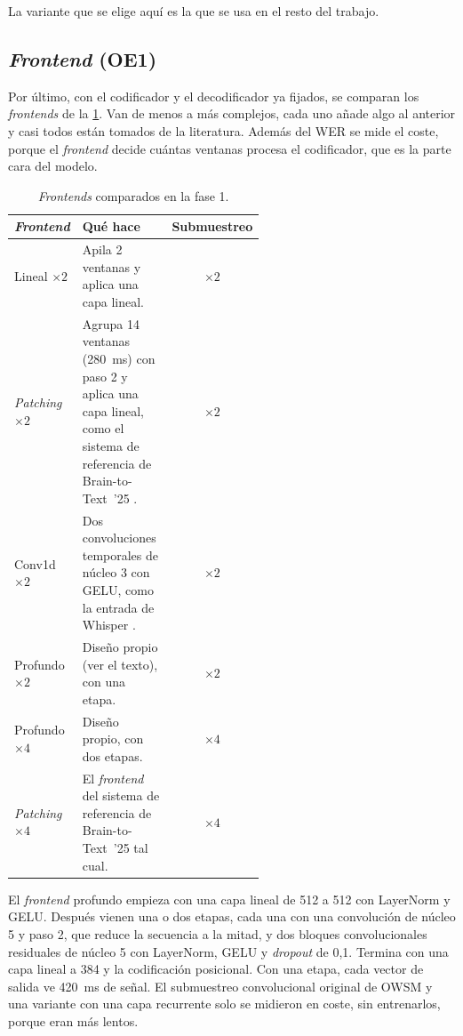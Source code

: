 La variante que se elige aquí es la que se usa en el resto del trabajo.

\subsection{\textit{Frontend} (OE1)}

Por último, con el codificador y el decodificador ya fijados, se comparan los \textit{frontends} de la \cref{tab:frontends}. Van de menos a más complejos, cada uno añade algo al anterior y casi todos están tomados de la literatura. Además del WER se mide el coste, porque el \textit{frontend} decide cuántas ventanas procesa el codificador, que es la parte cara del modelo.

\begin{table}[htbp]
  \centering
  \caption{\textit{Frontends} comparados en la fase 1.}
  \label{tab:frontends}
  \small
  \begin{tabular}{l>{\raggedright\arraybackslash}p{0.56\linewidth}c}
    \toprule
    \textbf{\textit{Frontend}} & \textbf{Qué hace} & \textbf{Submuestreo} \\
    \midrule
    Lineal $\times 2$    & Apila 2 ventanas y aplica una capa lineal. & $\times 2$ \\
    \textit{Patching} $\times 2$ & Agrupa 14 ventanas (\SI{280}{\milli\second}) con paso 2 y aplica una capa lineal, como el sistema de referencia de Brain-to-Text~'25 \cite{b2t25}. & $\times 2$ \\
    Conv1d $\times 2$    & Dos convoluciones temporales de núcleo 3 con GELU, como la entrada de Whisper \cite{radford2023whisper}. & $\times 2$ \\
    Profundo $\times 2$  & Diseño propio (ver el texto), con una etapa. & $\times 2$ \\
    Profundo $\times 4$  & Diseño propio, con dos etapas. & $\times 4$ \\
    \textit{Patching} $\times 4$ & El \textit{frontend} del sistema de referencia de Brain-to-Text~'25 tal cual. & $\times 4$ \\
    \bottomrule
  \end{tabular}
\end{table}

El \textit{frontend} profundo empieza con una capa lineal de 512 a 512 con LayerNorm y GELU. Después vienen una o dos etapas, cada una con una convolución de núcleo 5 y paso 2, que reduce la secuencia a la mitad, y dos bloques convolucionales residuales de núcleo 5 con LayerNorm, GELU y \textit{dropout} de 0,1. Termina con una capa lineal a 384 y la codificación posicional. Con una etapa, cada vector de salida ve \SI{420}{\milli\second} de señal. El submuestreo convolucional original de OWSM y una variante con una capa recurrente solo se midieron en coste, sin entrenarlos, porque eran más lentos.

